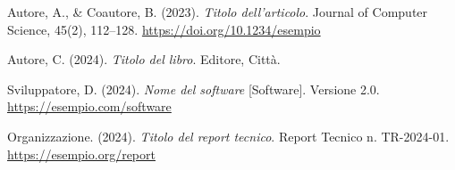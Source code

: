 \begin{thebibliography}{99}

Autore, A., \& Coautore, B. (2023).
\textit{Titolo dell'articolo}.
Journal of Computer Science, 45(2), 112--128.
\url{https://doi.org/10.1234/esempio}

Autore, C. (2024).
\textit{Titolo del libro}.
Editore, Città.

Sviluppatore, D. (2024).
\textit{Nome del software} [Software].
Versione 2.0.
\url{https://esempio.com/software}

Organizzazione. (2024).
\textit{Titolo del report tecnico}.
Report Tecnico n. TR-2024-01.
\url{https://esempio.org/report}

\end{thebibliography}


% 
%
